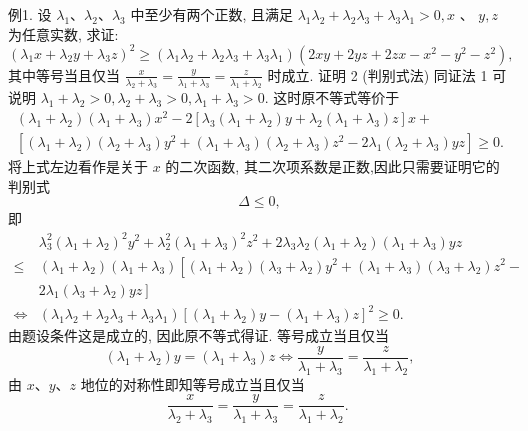 例1. 设 $\lambda_1 、 \lambda_2 、 \lambda_3$ 中至少有两个正数, 且满足 $\lambda_1 \lambda_2+\lambda_2 \lambda_3+\lambda_3 \lambda_1>0, x$ 、 $y, z$ 为任意实数, 求证:
$$
\left(\lambda_1 x+\lambda_2 y+\lambda_3 z\right)^2 \geqslant\left(\lambda_1 \lambda_2+\lambda_2 \lambda_3+\lambda_3 \lambda_1\right)\left(2 x y+2 y z+2 z x-x^2-y^2-z^2\right),
$$
其中等号当且仅当 $\frac{x}{\lambda_2+\lambda_3}=\frac{y}{\lambda_1+\lambda_3}=\frac{z}{\lambda_1+\lambda_2}$ 时成立.
证明 2 (判别式法)
同证法 1 可说明 $\lambda_1+\lambda_2>0, \lambda_2+\lambda_3>0, \lambda_1+\lambda_3>0$. 这时原不等式等价于
$$
\begin{gathered}
\left(\lambda_1+\lambda_2\right)\left(\lambda_1+\lambda_3\right) x^2-2\left[\lambda_3\left(\lambda_1+\lambda_2\right) y+\lambda_2\left(\lambda_1+\lambda_3\right) z\right] x+ \\
{\left[\left(\lambda_1+\lambda_2\right)\left(\lambda_2+\lambda_3\right) y^2+\left(\lambda_1+\lambda_3\right)\left(\lambda_2+\lambda_3\right) z^2-2 \lambda_1\left(\lambda_2+\lambda_3\right) y z\right] \geqslant 0 .}
\end{gathered}
$$
将上式左边看作是关于 $x$ 的二次函数, 其二次项系数是正数,因此只需要证明它的判别式
$$
\Delta \leqslant 0,
$$
即
$$
\begin{aligned}
& \lambda_3^2\left(\lambda_1+\lambda_2\right)^2 y^2+\lambda_2^2\left(\lambda_1+\lambda_3\right)^2 z^2+2 \lambda_3 \lambda_2\left(\lambda_1+\lambda_2\right)\left(\lambda_1+\lambda_3\right) y z \\
\leqslant & \left(\lambda_1+\lambda_2\right)\left(\lambda_1+\lambda_3\right)\left[\left(\lambda_1+\lambda_2\right)\left(\lambda_3+\lambda_2\right) y^2+\left(\lambda_1+\lambda_3\right)\left(\lambda_3+\lambda_2\right) z^2-\right. \\
& \left.2 \lambda_1\left(\lambda_3+\lambda_2\right) y z\right] \\
\Leftrightarrow & \left(\lambda_1 \lambda_2+\lambda_2 \lambda_3+\lambda_3 \lambda_1\right)\left[\left(\lambda_1+\lambda_2\right) y-\left(\lambda_1+\lambda_3\right) z\right]^2 \geqslant 0 .
\end{aligned}
$$
由题设条件这是成立的, 因此原不等式得证.
等号成立当且仅当
$$
\left(\lambda_1+\lambda_2\right) y=\left(\lambda_1+\lambda_3\right) z \Leftrightarrow \frac{y}{\lambda_1+\lambda_3}=\frac{z}{\lambda_1+\lambda_2},
$$
由 $x 、 y 、 z$ 地位的对称性即知等号成立当且仅当
$$
\frac{x}{\lambda_2+\lambda_3}=\frac{y}{\lambda_1+\lambda_3}=\frac{z}{\lambda_1+\lambda_2} \text {. }
$$



